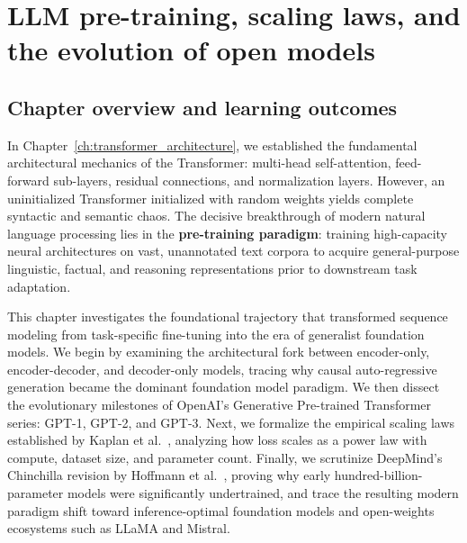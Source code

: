 \documentclass[../../main.tex]{subfiles}
\begin{document}
\chapter{LLM pre-training, scaling laws, and the evolution of open models}
\label{ch:scaling_laws_pretraining}

\section{Chapter overview and learning outcomes}
\label{sec:scaling_laws_overview}

In Chapter~\ref{ch:transformer_architecture}, we established the fundamental architectural mechanics of the Transformer: multi-head self-attention, feed-forward sub-layers, residual connections, and normalization layers. However, an uninitialized Transformer initialized with random weights yields complete syntactic and semantic chaos. The decisive breakthrough of modern natural language processing lies in the \textbf{pre-training paradigm}: training high-capacity neural architectures on vast, unannotated text corpora to acquire general-purpose linguistic, factual, and reasoning representations prior to downstream task adaptation.

This chapter investigates the foundational trajectory that transformed sequence modeling from task-specific fine-tuning into the era of generalist foundation models. We begin by examining the architectural fork between encoder-only, encoder-decoder, and decoder-only models, tracing why causal auto-regressive generation became the dominant foundation model paradigm. We then dissect the evolutionary milestones of OpenAI's Generative Pre-trained Transformer series: GPT-1, GPT-2, and GPT-3. Next, we formalize the empirical scaling laws established by Kaplan et al.~\cite{kaplan2020}, analyzing how loss scales as a power law with compute, dataset size, and parameter count. Finally, we scrutinize DeepMind's Chinchilla revision by Hoffmann et al.~\cite{hoffmann2022}, proving why early hundred-billion-parameter models were significantly undertrained, and trace the resulting modern paradigm shift toward inference-optimal foundation models and open-weights ecosystems such as LLaMA and Mistral.
\end{document}
